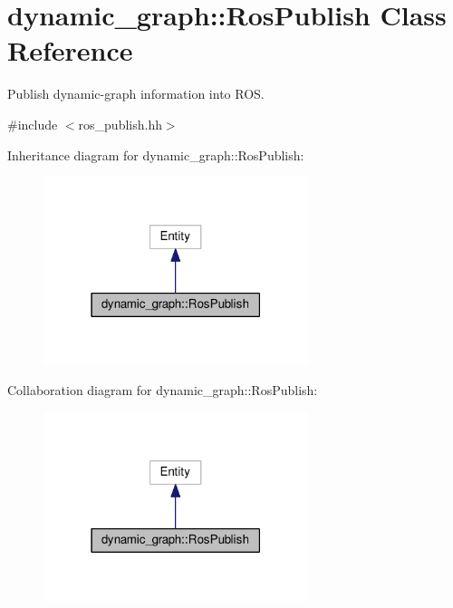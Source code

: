 \hypertarget{classdynamic__graph_1_1RosPublish}{}\section{dynamic\+\_\+graph\+:\+:Ros\+Publish Class Reference}
\label{classdynamic__graph_1_1RosPublish}


Publish dynamic-\/graph information into R\+OS.  




{\ttfamily \#include $<$ros\+\_\+publish.\+hh$>$}



Inheritance diagram for dynamic\+\_\+graph\+:\+:Ros\+Publish\+:
\nopagebreak
\begin{figure}[H]
\begin{center}
\leavevmode
\includegraphics[width=219pt]{classdynamic__graph_1_1RosPublish__inherit__graph}
\end{center}
\end{figure}


Collaboration diagram for dynamic\+\_\+graph\+:\+:Ros\+Publish\+:
\nopagebreak
\begin{figure}[H]
\begin{center}
\leavevmode
\includegraphics[width=219pt]{classdynamic__graph_1_1RosPublish__coll__graph}
\end{center}
\end{figure}
